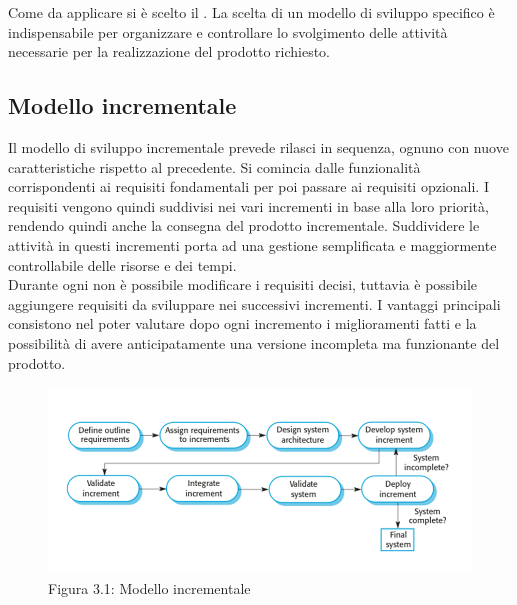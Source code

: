 Come  da applicare si è scelto il . La scelta di un modello di sviluppo specifico è indispensabile per organizzare e controllare lo svolgimento delle attività necessarie per la realizzazione del prodotto richiesto.

\subsection{Modello incrementale}
Il modello di sviluppo incrementale prevede rilasci in sequenza, ognuno con nuove caratteristiche rispetto al precedente. Si comincia dalle funzionalità corrispondenti ai requisiti fondamentali per poi passare ai requisiti opzionali. I requisiti vengono quindi suddivisi nei vari incrementi in base alla loro priorità, rendendo quindi anche la consegna del prodotto incrementale.
Suddividere le attività in questi incrementi porta ad una gestione semplificata e maggiormente controllabile delle risorse e dei tempi.\\
Durante ogni  non è possibile modificare i requisiti decisi, tuttavia è possibile aggiungere requisiti da sviluppare nei successivi incrementi.
I vantaggi principali consistono nel poter valutare dopo ogni incremento i miglioramenti fatti e la possibilità di avere anticipatamente una versione incompleta ma funzionante del prodotto. \\
\begin{center}
\begin{figure} [H]
	\centering
	\includegraphics[scale=0.65]{Img/Schema_modello_incrementale}
	\caption{Figura 3.1: Modello incrementale}\label{}
\end{figure}
\end{center}
